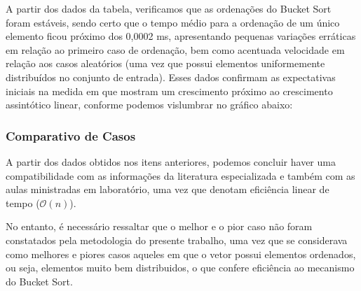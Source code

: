 \documentclass[a4paper, 12pt]{article}
\begin{document}
A partir dos dados da tabela, verificamos que as ordenações do Bucket Sort foram estáveis, sendo certo que o tempo médio para a ordenação de um único elemento ficou próximo dos 0,0002 ms, apresentando pequenas variações erráticas em relação ao primeiro caso de ordenação, bem como acentuada velocidade em relação aos casos aleatórios (uma vez que possui elementos uniformemente distribuídos no conjunto de entrada). Esses dados confirmam as expectativas iniciais na medida em que mostram um crescimento próximo ao crescimento assintótico linear, conforme podemos vislumbrar no gráfico abaixo:

\vspace{0.3cm}
\begin{center}
\end{center}

\subsubsection{Comparativo de Casos}

\tab{ }A partir dos dados obtidos nos itens anteriores, podemos concluir haver uma compatibilidade com as informações da literatura especializada e também com as aulas ministradas em laboratório, uma vez que denotam eficiência linear de tempo ($\mathcal{O} (n)$).

No entanto, é necessário ressaltar que o melhor e o pior caso não foram constatados pela metodologia do presente trabalho, uma vez que se considerava como melhores e piores casos aqueles em que o vetor possui elementos ordenados, ou seja, elementos muito bem distribuidos, o que confere eficiência ao mecanismo do Bucket Sort. 
\end{document}

